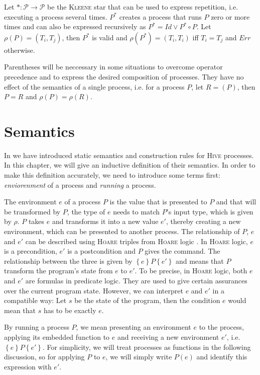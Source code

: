Let $* \colon \mathcal{P} \to \mathcal{P}$ be the \textsc{Kleene} star that can be used to express repetition, i.e. executing a process several times. $P^*$ creates a process that runs $P$ zero or more times and can also be expressed recursively as $P^* = Id \vee P^* \circ P$. Let $\rho \left( P \right) = \left( T_i, T_j \right)$, then $P^*$ is valid and $\rho \left( P^* \right) = \left( T_i, T_i \right)$ iff $T_i = T_j$ and $Err$ otherwise.

Parentheses will be neccessary in some situations to overcome operator precedence and to express the desired composition of processes. They have no effect of the semantics of a single process, i.e. for a process $P$, let $R = \left( P \right)$, then $P = R$ and $\rho \left( P \right) = \rho \left( R \right)$.

\section{Semantics}
In  we have introduced static semantics and construction rules for \textsc{Hive} processes. In this chapter, we will give an inductive definition of their semantics. In order to make this definition accurately, we need to introduce some terms first: \textit{enviorenment} of a process and \textit{running} a process.

The environment $e$ of a process $P$ is the value that is presented to $P$ and that will be transformed by $P$, the type of $e$ needs to match $P$'s input type, which is given by $\rho$. $P$ takes $e$ and transforms it into a new value $e'$, thereby creating a new environment, which can be presented to another process. The relationship of $P$, $e$ and $e'$ can be described using \textsc{Hoare} triples from \textsc{Hoare} logic \cite{}. In \textsc{Hoare} logic, $e$ is a precondition, $e'$ is a postcondition and $P$ gives the command. The relationship between the three is given by $\left\{ e \right\} P \left\{ e' \right\}$ and means that $P$ transform the program's state from $e$ to $e'$. To be precise, in \textsc{Hoare} logic, both $e$ and $e'$ are formulas in predicate logic. They are used to give certain assurances over the current program state. However, we can interpret $e$ and $e'$ in a compatible way: Let $s$ be the state of the program, then the condition $e$ would mean that $s$ has to be exactly $e$.

By running a process $P$, we mean presenting an environment $e$ to the process, applying its embedded function to $e$ and receiving a new environment $e'$, i.e. $\left\{ e \right\} P \left\{ e' \right\}$. For simplicity, we will treat processes as functions in the following discussion, so for applying $P$ to $e$, we will simply write $P \left( e \right)$ and identify this expression with $e'$.

